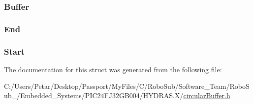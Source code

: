 \subsubsection[{Buffer}]{ Buffer}\label{struct_circular_buffer_struct_a490a001f53f2194dc8acd486ec9cb11f}
\hypertarget{struct_circular_buffer_struct_aa2432381b7551368cc3e528f28a97ac0}{}
\subsubsection[{End}]{ End}\label{struct_circular_buffer_struct_aa2432381b7551368cc3e528f28a97ac0}
\hypertarget{struct_circular_buffer_struct_a90df916af143181811b3da72397fc15c}{}
\subsubsection[{Start}]{ Start}\label{struct_circular_buffer_struct_a90df916af143181811b3da72397fc15c}


The documentation for this struct was generated from the following file\+:\begin{DoxyCompactItemize}
\item 
C\+:/\+Users/\+Petar/\+Desktop/\+Passport/\+My\+Files/\+C/\+Robo\+Sub/\+Software\+\_\+\+Team/\+Robo\+Sub\+\_/\+Embedded\+\_\+\+Systems/\+P\+I\+C24\+F\+J32\+G\+B004/\+H\+Y\+D\+R\+A\+S.\+X/\hyperlink{_h_y_d_r_a_s_8_x_2circular_buffer_8h}{circular\+Buffer.\+h}\end{DoxyCompactItemize}

